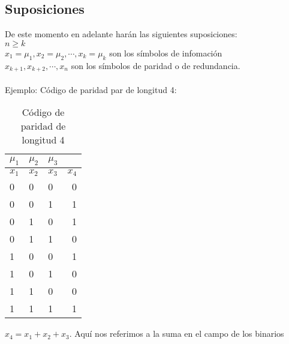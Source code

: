 \documentclass[11pt,a4paper]{article}
\begin{document}
\subsection{Suposiciones}
De este momento en adelante harán las siguientes suposiciones: 
\\$n \geq k$
\\$x_{1} = \mu_{1}, x_{2} = \mu_{2}, \cdots, x_{k} = \mu_{k}$ son los símbolos de infomación
\\$x_{k+1}, x_{k+2}, \cdots,x_{n}$ son los símbolos de paridad o de redundancia.
\\\\Ejemplo: Código de paridad par de longitud 4:
\begin{table}[h!]
\begin{center}
\caption{Código de paridad de longitud 4}
\label{tab:table1}
\begin{tabular}{l|l|l|r}
\textbf{$\mu_{1}$}&\textbf{$\mu_{2}$}&\textbf{$\mu_{3}$} \\
\hline
$x_{1}$ &$x_{2}$ &$x_{3}$ &$x_{4}$ \\
\hline
0 & 0 & 0 &0\\
0 & 0 & 1 &1\\
0 & 1 & 0 &1\\
0 & 1 & 1 &0\\
1 & 0 & 0 &1\\
1 & 0 & 1 &0\\
1 & 1 & 0 &0\\
1 & 1 & 1 &1\\
\end{tabular}
\end{center}
\end{table}

$x_4 = x_{1} + x_{2} + x_{3}$. Aquí nos referimos a la suma en el campo de los binarios
\end{document}

